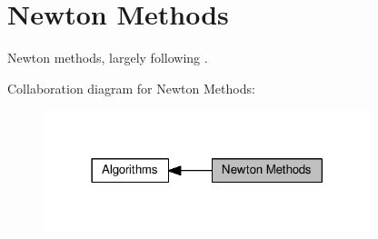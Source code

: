 \hypertarget{group__NewtonGroup}{}\section{Newton Methods}
\label{group__NewtonGroup}


Newton methods, largely following \cite{Deuflhard2004}.  


Collaboration diagram for Newton Methods\+:\nopagebreak
\begin{figure}[H]
\begin{center}
\leavevmode
\includegraphics[width=270pt]{group__NewtonGroup}
\end{center}
\end{figure}

